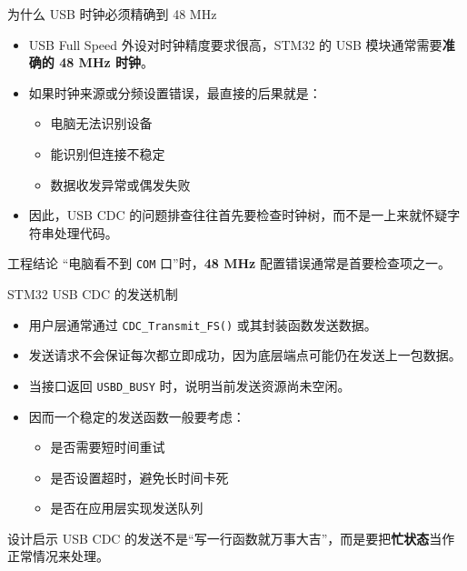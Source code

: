 \documentclass[11pt,aspectratio=169]{ctexbeamer}
\newcommand{\code}[1]{\texttt{#1}}
\newcommand{\term}[1]{\textbf{\color{PrimaryBlue}#1}}
\begin{document}
\begin{frame}{为什么 USB 时钟必须精确到 48 MHz}
  \begin{itemize}
    \item USB Full Speed 外设对时钟精度要求很高，STM32 的 USB 模块通常需要\term{准确的 48 MHz 时钟}。
    \item 如果时钟来源或分频设置错误，最直接的后果就是：
      \begin{itemize}
        \item 电脑无法识别设备
        \item 能识别但连接不稳定
        \item 数据收发异常或偶发失败
      \end{itemize}
    \item 因此，USB CDC 的问题排查往往首先要检查时钟树，而不是一上来就怀疑字符串处理代码。
  \end{itemize}

  \vspace{0.4em}
  \begin{alertblock}{工程结论}
    “电脑看不到 \code{COM} 口”时，\term{48 MHz} 配置错误通常是首要检查项之一。
  \end{alertblock}
\end{frame}

\begin{frame}{STM32 USB CDC 的发送机制}
  \small
  \begin{itemize}
    \item 用户层通常通过 \code{CDC\_Transmit\_FS()} 或其封装函数发送数据。
    \item 发送请求不会保证每次都立即成功，因为底层端点可能仍在发送上一包数据。
    \item 当接口返回 \code{USBD\_BUSY} 时，说明当前发送资源尚未空闲。
    \item 因而一个稳定的发送函数一般要考虑：
      \begin{itemize}
        \item 是否需要短时间重试
        \item 是否设置超时，避免长时间卡死
        \item 是否在应用层实现发送队列
      \end{itemize}
  \end{itemize}

  \begin{block}{设计启示}
    USB CDC 的发送不是“写一行函数就万事大吉”，而是要把\term{忙状态}当作正常情况来处理。
  \end{block}
\end{frame}
\end{document}
